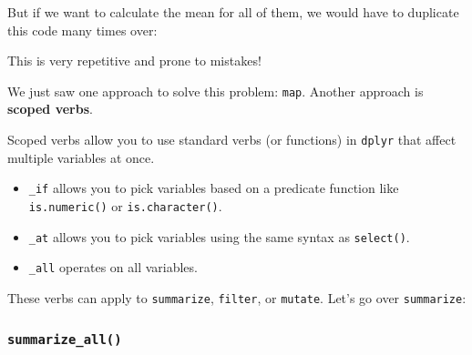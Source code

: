 \documentclass[
]{book}
\newenvironment{Shaded}{\begin{snugshade}}{\end{snugshade}}
\newcommand{\CommentTok}[1]{\textcolor[rgb]{0.56,0.35,0.01}{\textit{#1}}}
\newcommand{\DataTypeTok}[1]{\textcolor[rgb]{0.13,0.29,0.53}{#1}}
\newcommand{\KeywordTok}[1]{\textcolor[rgb]{0.13,0.29,0.53}{\textbf{#1}}}
\newcommand{\NormalTok}[1]{#1}
\newcommand{\OperatorTok}[1]{\textcolor[rgb]{0.81,0.36,0.00}{\textbf{#1}}}
\newcommand{\StringTok}[1]{\textcolor[rgb]{0.31,0.60,0.02}{#1}}
\providecommand{\tightlist}{%
  \setlength{\itemsep}{0pt}\setlength{\parskip}{0pt}}
\begin{document}
But if we want to calculate the mean for all of them, we would have to duplicate this code many times over:

\begin{Shaded}
\end{Shaded}

This is very repetitive and prone to mistakes!

We just saw one approach to solve this problem: \texttt{map}. Another approach is \textbf{scoped verbs}.

Scoped verbs allow you to use standard verbs (or functions) in \texttt{dplyr} that affect multiple variables at once.

\begin{itemize}
\tightlist
\item
  \texttt{\_if} allows you to pick variables based on a predicate function like \texttt{is.numeric()} or \texttt{is.character()}.
\item
  \texttt{\_at} allows you to pick variables using the same syntax as \texttt{select()}.
\item
  \texttt{\_all} operates on all variables.
\end{itemize}

These verbs can apply to \texttt{summarize}, \texttt{filter}, or \texttt{mutate}. Let's go over \texttt{summarize}:

\hypertarget{summarize_all}{%
\subsubsection*{\texorpdfstring{\texttt{summarize\_all()}}{summarize\_all()}}\label{summarize_all}}
\end{document}
